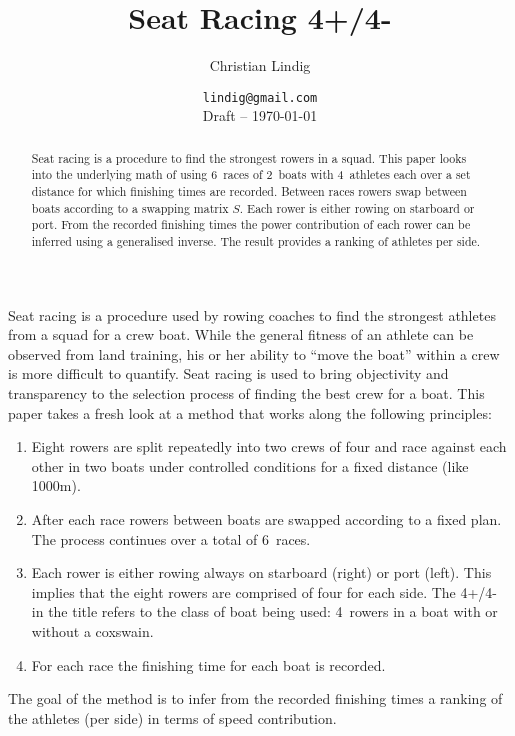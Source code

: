 \documentclass[a4paper,11pt]{article}
\title{Seat Racing 4+/4-}
\author{Christian Lindig}
\date{\texttt{lindig@gmail.com}\\[2ex] Draft -- \today}
\begin{document}
\maketitle

\begin{abstract}
\noindent Seat racing is a procedure to find the strongest rowers in a
  squad. This paper looks into the underlying math of using 6~races of
  2~boats with 4~athletes each over a set distance for which finishing
  times are recorded. Between races rowers swap between boats according
  to a swapping matrix $S$.  Each rower is either rowing on starboard or
  port. From the recorded finishing times the power contribution of each
  rower can be inferred using a generalised inverse. The result provides
a ranking of athletes per side.  \end{abstract}

\noindent Seat racing is a procedure used by rowing coaches to find the
strongest athletes from a squad for a crew boat. While the general
fitness of an athlete can be observed from land training, his or her
ability to ``move the boat'' within a crew is more difficult to
quantify. Seat racing is used to bring objectivity and transparency to
the selection process of finding the best crew for a boat. This paper
takes a fresh look at a method that works along the following
principles:

\begin{enumerate}
  \item Eight rowers are split repeatedly into two crews of four and
  race against each other in two boats under controlled conditions for a
  fixed distance (like 1000m).  
  
  \item After each race rowers between boats are swapped according to a
  fixed plan.  The process continues over a total of 6~races.

  \item Each rower is either rowing always on starboard (right) or port
  (left). This implies that the eight rowers are comprised of four for
  each side. The 4+/4- in the title refers to the class of boat being
  used: 4~rowers in a boat with or without a coxswain.

\item For each race the finishing time for each boat is recorded. \end{enumerate}

The goal of the method is to infer from the recorded finishing times a
ranking of the athletes (per side) in terms of speed contribution.
\end{document}
